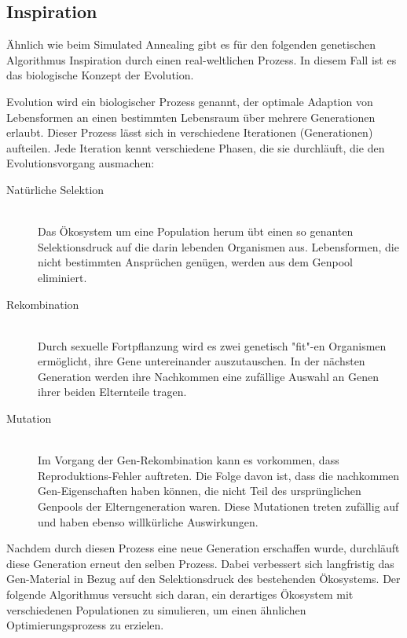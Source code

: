\documentclass[runningheads,a4paper]{llncs}
\begin{document}
\subsection{Inspiration}

Ähnlich wie beim Simulated Annealing gibt es für den folgenden genetischen Algorithmus Inspiration durch einen real-weltlichen Prozess. In diesem Fall ist es das biologische Konzept der Evolution.

Evolution wird ein biologischer Prozess genannt, der optimale Adaption von Lebensformen an einen bestimmten Lebensraum über mehrere Generationen erlaubt. Dieser Prozess lässt sich in verschiedene Iterationen (Generationen) aufteilen. Jede Iteration kennt verschiedene Phasen, die sie durchläuft, die den Evolutionsvorgang ausmachen:

\begin{description}
	\item[Natürliche Selektion] \hfill \\ Das Ökosystem um eine Population herum übt einen so genanten Selektionsdruck auf die darin lebenden Organismen aus. Lebensformen, die nicht bestimmten Ansprüchen genügen, werden aus dem Genpool eliminiert.

	\item[Rekombination] \hfill \\ Durch sexuelle Fortpflanzung wird es zwei genetisch "fit"-en Organismen ermöglicht, ihre Gene untereinander auszutauschen. In der nächsten Generation werden ihre Nachkommen eine zufällige Auswahl an Genen ihrer beiden Elternteile tragen.

	\item[Mutation] \hfill \\ Im Vorgang der Gen-Rekombination kann es vorkommen, dass Reproduktions-Fehler auftreten. Die Folge davon ist, dass die nachkommen Gen-Eigenschaften haben können, die nicht Teil des ursprünglichen Genpools der Elterngeneration waren. Diese Mutationen treten zufällig auf und haben ebenso willkürliche Auswirkungen.
\end{description}

Nachdem durch diesen Prozess eine neue Generation erschaffen wurde, durchläuft diese Generation erneut den selben Prozess. Dabei verbessert sich langfristig das Gen-Material in Bezug auf den Selektionsdruck des bestehenden Ökosystems. Der folgende Algorithmus versucht sich daran,  ein derartiges Ökosystem mit verschiedenen Populationen zu simulieren, um einen ähnlichen Optimierungsprozess zu erzielen.
\end{document}
